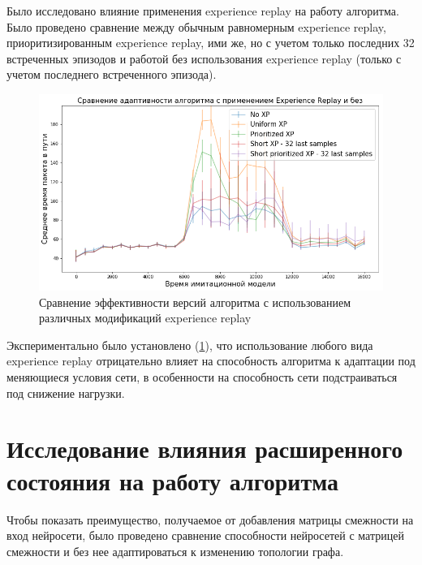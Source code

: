 \documentclass[specification, annotation]{itmo-student-thesis}
\begin{document}
Было исследовано влияние применения experience replay на работу алгоритма. Было
проведено сравнение между обычным равномерным experience replay,
приоритизированным experience replay\cite{schaul2015prioritized}, ими же, но с
учетом только последних 32 встреченных эпизодов и работой без
использования experience replay (только с учетом последнего встреченного эпизода).

\begin{figure}[!h]
  \caption{Сравнение эффективности версий алгоритма с использованием различных
    модификаций experience replay}\label{experiments-xp-variants}
  \centering
  \includegraphics[scale=0.6]{experiments-xp-variants}
\end{figure}

Экспериментально было установлено (\ref{experiments-xp-variants}), что
использование любого вида experience replay отрицательно влияет на способность
алгоритма к адаптации под меняющиеся условия сети, в особенности на способность
сети подстраиваться под снижение нагрузки.

\section{Исследование влияния расширенного состояния на работу алгоритма}\label{apx:amatrix}

Чтобы показать преимущество, получаемое от добавления матрицы смежности на вход
нейросети, было проведено сравнение способности нейросетей с матрицей смежности и
без нее адаптироваться к изменению топологии графа.
\end{document}
